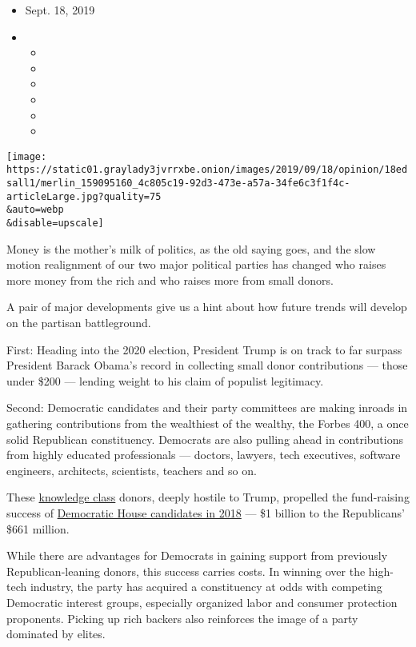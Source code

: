 \begin{itemize}
\item
  Sept. 18, 2019
\item
  \begin{itemize}
  \item
  \item
  \item
  \item
  \item
  \item
  \end{itemize}
\end{itemize}

\texttt{[image: https://static01.graylady3jvrrxbe.onion/images/2019/09/18/opinion/18edsall1/merlin\_159095160\_4c805c19-92d3-473e-a57a-34fe6c3f1f4c-articleLarge.jpg?quality=75\\\&auto=webp\\\&disable=upscale]}

Money is the mother's milk of politics, as the old saying goes, and the
slow motion realignment of our two major political parties has changed
who raises more money from the rich and who raises more from small
donors.

A pair of major developments give us a hint about how future trends will
develop on the partisan battleground.

First: Heading into the 2020 election, President Trump is on track to
far surpass President Barack Obama's record in collecting small donor
contributions --- those under \$200 --- lending weight to his claim of
populist legitimacy.

Second: Democratic candidates and their party committees are making
inroads in gathering contributions from the wealthiest of the wealthy,
the Forbes 400, a once solid Republican constituency. Democrats are also
pulling ahead in contributions from highly educated professionals ---
doctors, lawyers, tech executives, software engineers, architects,
scientists, teachers and so on.

These
\href{https://books.google.com/books?hl=en\&lr=\&id=_MeCr31C9S8C\&oi=fnd\&pg=PR7\&dq=Mosco+and+McKercher+knowledge+worker\&ots=FvIgNUtEdr\&sig=QOCB7sbOf2Y7PT-f4SQZIsvcrh8\#v=onepage\&q=Mosco\%20and\%20McKercher\%20knowledge\%20worker\&f=false}{knowledge
class} donors, deeply hostile to Trump, propelled the fund-raising
success of
\href{https://www.opensecrets.org/overview/index.php?display=T\&type=A\&cycle=2018}{Democratic
House candidates in 2018} --- \$1 billion to the Republicans' \$661
million.

While there are advantages for Democrats in gaining support from
previously Republican-leaning donors, this success carries costs. In
winning over the high-tech industry, the party has acquired a
constituency at odds with competing Democratic interest groups,
especially organized labor and consumer protection proponents. Picking
up rich backers also reinforces the image of a party dominated by
elites.

